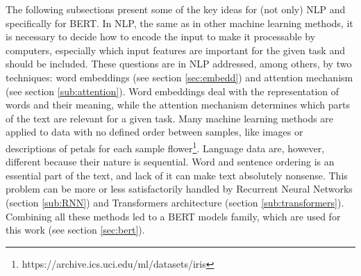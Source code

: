 The following subsections present some of the key ideas for (not only) NLP and specifically for BERT. In NLP, the same as in other machine learning methods, it is necessary to decide how to encode the input to make it processable by computers, especially which input features are important for the given task and should be included. These questions are in NLP addressed, among others, by two techniques: word embeddings (see section \ref{sec:embedd}) and attention mechanism (see section \ref{sub:attention}). Word embeddings deal with the representation of words and their meaning, while the attention mechanism determines which parts of the text are relevant for a given task. Many machine learning methods are applied to data with no defined order between samples, like images or descriptions of petals for each sample flower\footnote{https://archive.ics.uci.edu/ml/datasets/iris}.
Language data are, however, different because their nature is sequential. Word and sentence ordering is an essential part of the text, and lack of it can make text absolutely nonsense. This problem can be more or less satisfactorily handled by Recurrent Neural Networks (section \ref{sub:RNN}) and Transformers architecture (section \ref{sub:transformers}). Combining all these methods led to a BERT models family, which are used for this work (see section \ref{sec:bert}).

